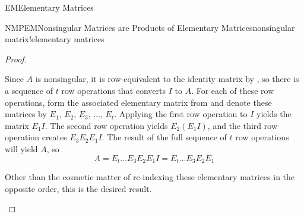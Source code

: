 \begin{subsect}{EM}{Elementary Matrices}
\begin{theorem}{NMPEM}{Nonsingular Matrices are Products of Elementary Matrices}{nonsingular matrix!elementary matrices}
\end{theorem}
%
\begin{proof}
\begin{para}Since $A$ is nonsingular, it is row-equivalent to the identity matrix by , so there is a sequence of $t$ row operations that converts $I$ to $A$.  For each of these row operations, form the associated elementary matrix from  and denote these matrices by $E_1,\,E_2,\,E_3,\,\dots,\,E_t$.  Applying the first row operation to $I$ yields the matrix $E_1I$.  The second row operation yields $E_2(E_1I)$, and the third row operation creates $E_3E_2E_1I$.  The result of the full sequence of $t$ row operations will yield $A$, so
%
\begin{equation*}
A=  E_t\dots E_3E_2E_1I= E_t\dots E_3E_2E_1
\end{equation*}
\end{para}
%
\begin{para}Other than the cosmetic matter of re-indexing these elementary matrices in the opposite order, this is the desired result.\end{para}
%
\end{proof}
%
%
\end{subsect}
%
